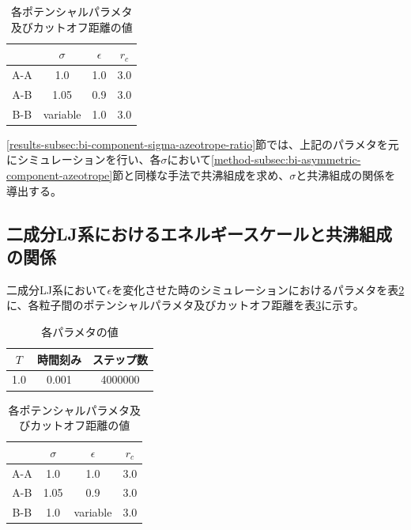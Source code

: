 \documentclass[titlepage]{jsreport}
\begin{document}
\begin{table}[htbp]
    \begin{center}
        \caption{各ポテンシャルパラメタ及びカットオフ距離の値}
        \label{table:bi-component-sigma-azeotrope-ratio-potential-parameter}
        \begin{tabular}{c | c c c}
            & $\sigma$ & $\epsilon$ & $r_c$ \\
            \hline
            A-A & 1.0 & 1.0 & 3.0 \\
            A-B & 1.05 & 0.9 & 3.0 \\
            B-B & variable & 1.0 & 3.0
        \end{tabular}
    \end{center}
\end{table}

\ref{results-subsec:bi-component-sigma-azeotrope-ratio}節では、上記のパラメタを元にシミュレーションを行い、各$\sigma$において\ref{method-subsec:bi-asymmetric-component-azeotrope}節と同様な手法で共沸組成を求め、$\sigma$と共沸組成の関係を導出する。


\subsection{二成分LJ系におけるエネルギースケールと共沸組成の関係} \label{method-subsec:bi-component-epsilon-azeotrope-ratio}
二成分LJ系において${\epsilon}$を変化させた時のシミュレーションにおけるパラメタを表\ref{table:bi-component-epsilon-azeotrope-ratio-parameter}に、各粒子間のポテンシャルパラメタ及びカットオフ距離を表\ref{table:bi-component-epsilon-azeotrope-ratio-potential-parameter}に示す。

\begin{table}[htbp]
    \begin{center}
        \caption{各パラメタの値}
        \label{table:bi-component-epsilon-azeotrope-ratio-parameter}
        \begin{tabular}{c c c}
            $T$ & 時間刻み & ステップ数 \\
            \hline
            1.0 & 0.001 & 4000000 \\
        \end{tabular}
    \end{center}
\end{table}

\begin{table}[htbp]
    \begin{center}
        \caption{各ポテンシャルパラメタ及びカットオフ距離の値}
        \label{table:bi-component-epsilon-azeotrope-ratio-potential-parameter}
        \begin{tabular}{c | c c c}
            & $\sigma$ & $\epsilon$ & $r_c$ \\
            \hline
            A-A & 1.0 & 1.0 & 3.0 \\
            A-B & 1.05 & 0.9 & 3.0 \\
            B-B & 1.0 & variable & 3.0
        \end{tabular}
    \end{center}
\end{table}
\end{document}
